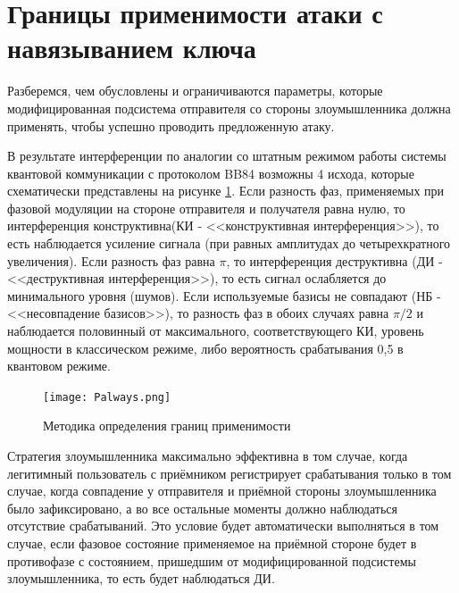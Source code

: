 \section{Границы применимости атаки с навязыванием ключа} \label{sec:ch3/sec2}

Разберемся, чем обусловлены и ограничиваются параметры, которые модифицированная подсистема отправителя со стороны злоумышленника должна применять, чтобы успешно проводить предложенную атаку. 

В результате интерференции по аналогии со штатным режимом работы системы квантовой коммуникации с протоколом BB84 возможны 4 исхода, которые схематически представлены на рисунке \ref{fig:Palways}. Если разность фаз, применяемых при фазовой модуляции на стороне отправителя и получателя равна нулю, то интерференция конструктивна(КИ - <<конструктивная интерференция>>), то есть наблюдается усиление сигнала (при равных амплитудах  до четырехкратного увеличения). Если разность фаз равна $\pi$, то интерференция деструктивна (ДИ - <<деструктивная интерференция>>), то есть сигнал ослабляется до минимального уровня (шумов). Если используемые базисы не совпадают (НБ - <<несовпадение базисов>>), то разность фаз в обоих случаях равна $\pi/2$ и наблюдается половинный от максимального, соответствующего КИ, уровень мощности в классическом режиме, либо вероятность срабатывания 0,5 в квантовом режиме. 


 \begin{figure}[ht]
  \centering
  \texttt{[image: Palways.png]}
  \caption{Методика определения границ применимости}
  \label{fig:Palways}
\end{figure}


Стратегия злоумышленника максимально эффективна в том случае, когда легитимный пользователь с приёмником регистрирует срабатывания только в том случае, когда совпадение у отправителя и приёмной стороны злоумышленника было зафиксировано, а во все остальные моменты должно наблюдаться отсутствие срабатываний. Это условие будет автоматически выполняться в том случае, если фазовое состояние применяемое на приёмной стороне будет в противофазе с состоянием, пришедшим от модифицированной подсистемы злоумышленника, то есть будет наблюдаться ДИ. 

